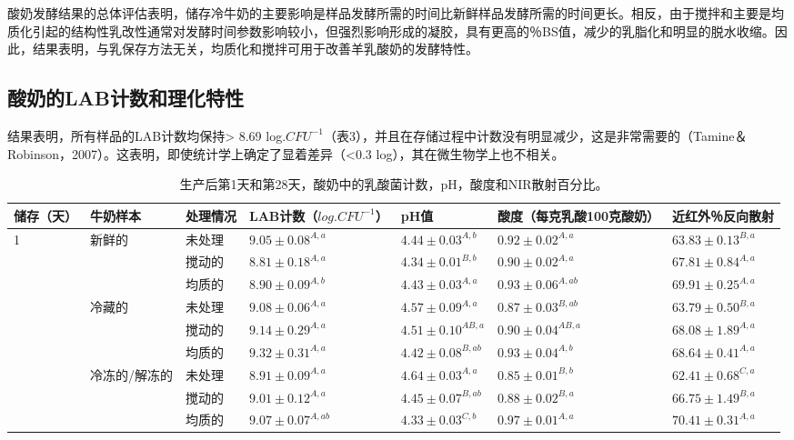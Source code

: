 \documentclass[twocolumn]{ctexart}
\begin{document}
酸奶发酵结果的总体评估表明，储存冷牛奶的主要影响是样品发酵所需的时间比新鲜样品发酵所需的时间更长。相反，由于搅拌和主要是均质化引起的结构性乳改性通常对发酵时间参数影响较小，但强烈影响形成的凝胶，具有更高的％BS值，减少的乳脂化和明显的脱水收缩。因此，结果表明，与乳保存方法无关，均质化和搅拌可用于改善羊乳酸奶的发酵特性。

\subsection{酸奶的LAB计数和理化特性}
结果表明，所有样品的LAB计数均保持> 8.69 log.$CFU^{-1}$（表3），并且在存储过程中计数没有明显减少，这是非常需要的（Tamine＆Robinson，2007）。这表明，即使统计学上确定了显着差异（<0.3 log），其在微生物学上也不相关。

\begin{table*}[!htb]
\centering
\caption{生产后第1天和第28天，酸奶中的乳酸菌计数，pH，酸度和NIR散射百分比。}
\begin{threeparttable}
\begin{tabular}{lllllll}
	\hline
	储存（天）& 牛奶样本 & 处理情况 & LAB计数（$log.CFU^{-1}$） & pH值 & 酸度（每克乳酸100克酸奶）& 近红外％反向散射\\ 
	\hline
	1 & 新鲜的 & 未处理 & $9.05 \pm 0.08^{A,a}$ & $4.44 \pm 0.03^{A,b}$ & $0.92 \pm 0.02^{A,a}$ & $63.83 \pm 0.13^{B,a}$\\
      &        & 搅动的 & $8.81 \pm 0.18^{A,a}$ & $4.34 \pm 0.01^{B,b}$ & $0.90 \pm 0.02^{A,a}$ & $67.81 \pm 0.84^{A,a}$\\
	  &        & 均质的 & $8.90 \pm 0.09^{A,b}$ & $4.43 \pm 0.03^{A,a}$ & $0.93 \pm 0.06^{A,ab}$ & $69.91 \pm 0.25^{A,a}$\\
	  & 冷藏的 & 未处理 & $9.08 \pm 0.06^{A,a}$ & $4.57 \pm 0.09^{A,a}$ & $0.87 \pm 0.03^{B,ab}$ & $63.79 \pm 0.50^{B,a}$\\
	  &        & 搅动的 & $9.14 \pm 0.29^{A,a}$ & $4.51 \pm 0.10^{AB,a}$ & $0.90 \pm 0.04^{AB,a}$ & $68.08 \pm 1.89^{A,a}$\\
      &        & 均质的 & $9.32 \pm 0.31^{A,a}$ & $4.42 \pm 0.08^{B,ab}$ & $0.93 \pm 0.04^{A,b}$ & $68.64 \pm 0.41^{A,a}$\\
      & 冷冻的/解冻的 & 未处理 & $8.91 \pm 0.09^{A,a}$ & $4.64 \pm 0.03^{A,a}$ & $0.85 \pm 0.01^{B,b}$ & $62.41 \pm 0.68^{C,a}$\\
      &               & 搅动的 & $9.01 \pm 0.12^{A,a}$ & $4.45 \pm 0.07^{B,ab}$ & $0.88 \pm 0.02^{B,a}$ & $66.75 \pm 1.49^{B,a}$\\
      &               & 均质的 & $9.07 \pm 0.07^{A,ab}$ & $4.33 \pm 0.03^{C,b}$ & $0.97 \pm 0.01^{A,a}$ & $70.41 \pm 0.31^{A,a}$\\

\end{tabular}
\end{threeparttable}
\end{table*}
\end{document}
